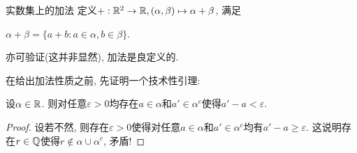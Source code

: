 \begin{definition}{实数集上的加法}
	定义$+: \mathbb{R} ^2 \to \mathbb{R} , (\alpha , \beta) \mapsto \alpha + \beta$, 满足
	\begin{center}
		$\alpha + \beta = \{ a+b: a \in \alpha , b \in \beta \}.$
	\end{center}
\end{definition}

亦可验证(这并非显然), 加法是良定义的. 

在给出加法性质之前, 先证明一个技术性引理: 

\begin{lemma}{}
	设$\alpha \in \mathbb{R}$. 则对任意$\varepsilon >0$均存在$a \in \alpha$和$a' \in \alpha ^c$使得$a'-a<\varepsilon$. 
\end{lemma}
\begin{proof}
	设若不然, 则存在$\varepsilon >0$使得对任意$a \in \alpha$和$a' \in \alpha ^c$均有$a'-a\geq \varepsilon$. 这说明存在$r \in \mathbb{Q}$使得$r \notin \alpha \cup \alpha ^c$, 矛盾! 
\end{proof}

